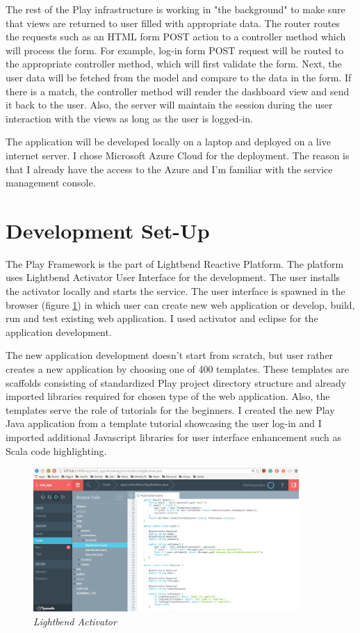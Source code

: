 \documentclass[12pt,twoside,a4paper]{report}
\begin{document}
The rest of the Play infrastructure is working in "the background" to make sure that views are returned to user filled with appropriate data. The router routes the requests such as an HTML form POST action to a controller method which will process the form. For example, log-in form POST request will be routed to the appropriate controller method, which will first validate the form. Next, the user data will be fetched from the model and compare to the data in the form. If there is a match, the controller method will render the dashboard view and send it back to the user. Also, the server will maintain the session during the user interaction with the views as long as the user is logged-in.

The application will be developed locally on a laptop and deployed on a live internet server. I chose Microsoft Azure Cloud for the deployment.  The reason is that I already have the access to the Azure and I'm familiar with the service management console.

\section{Development Set-Up}\label{4.2}
The Play Framework is the part of Lightbend Reactive Platform\cite{32}. The platform uses Lightbend Activator User Interface for the development. The user installs the activator locally and starts the service. The user interface is spawned in the browser (figure \ref{f4.2}) in which user can create new web application or develop, build, run and test existing web application. I used activator and eclipse for the application development.

The new application development doesn't start from scratch, but user rather creates a new application by choosing one of 400 templates. These templates are scaffolds consisting of standardized Play project directory structure and already imported libraries required for chosen type of the web application. Also, the templates serve the role of tutorials for the beginners. I created the new Play Java application from a template tutorial showcasing the user log-in and I imported additional Javascript libraries for user interface enhancement such as Scala code highlighting.

\begin{figure}[!ht]
	\centering
		\includegraphics[width=0.9\textwidth, totalheight=8cm]
		{activator}
	\caption{\textit{Lightbend Activator}}
	\label{f4.2}
\end{figure}
\end{document}
